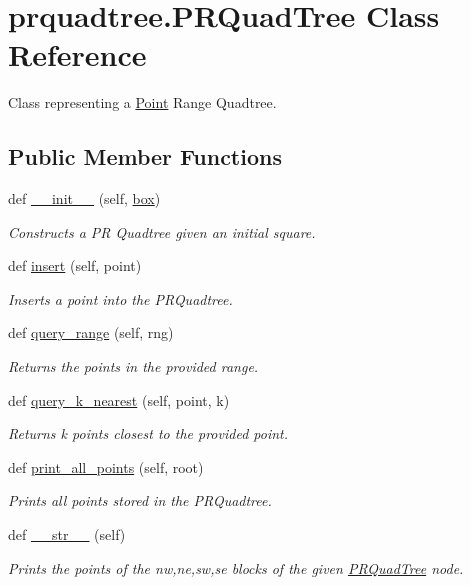 \section{prquadtree.\+P\+R\+Quad\+Tree Class Reference}
\label{classprquadtree_1_1PRQuadTree}


Class representing a \hyperlink{classprquadtree_1_1Point}{Point} Range Quadtree.  


\subsection*{Public Member Functions}
\begin{DoxyCompactItemize}
\item 
def \hyperlink{classprquadtree_1_1PRQuadTree_a56de30271f808d21281b790a19448aab}{\+\_\+\+\_\+init\+\_\+\+\_\+} (self, \hyperlink{classprquadtree_1_1PRQuadTree_a2f1d8e21568aa0467a7dabedb50e3593}{box})
\begin{DoxyCompactList}\small\item\em Constructs a P\+R Quadtree given an initial square. \end{DoxyCompactList}\item 
def \hyperlink{classprquadtree_1_1PRQuadTree_ab9ca8c1d94c56c72f47dabd2f90b7754}{insert} (self, point)
\begin{DoxyCompactList}\small\item\em Inserts a point into the P\+R\+Quadtree. \end{DoxyCompactList}\item 
def \hyperlink{classprquadtree_1_1PRQuadTree_ab145cd20b246f04ddcd53ae9618b5479}{query\+\_\+range} (self, rng)
\begin{DoxyCompactList}\small\item\em Returns the points in the provided range. \end{DoxyCompactList}\item 
def \hyperlink{classprquadtree_1_1PRQuadTree_a578891ac618a6770184fc1c02f426b45}{query\+\_\+k\+\_\+nearest} (self, point, k)
\begin{DoxyCompactList}\small\item\em Returns k points closest to the provided point. \end{DoxyCompactList}\item 
def \hyperlink{classprquadtree_1_1PRQuadTree_a0d43d9d2ebe765b6690067c1d8bc5a8a}{print\+\_\+all\+\_\+points} (self, root)
\begin{DoxyCompactList}\small\item\em Prints all points stored in the P\+R\+Quadtree. \end{DoxyCompactList}\item 
def \hyperlink{classprquadtree_1_1PRQuadTree_a2f9dd431836575327c97cd3fb5426adb}{\+\_\+\+\_\+str\+\_\+\+\_\+} (self)
\begin{DoxyCompactList}\small\item\em Prints the points of the nw,ne,sw,se blocks of the given \hyperlink{classprquadtree_1_1PRQuadTree}{P\+R\+Quad\+Tree} node. \end{DoxyCompactList}\end{DoxyCompactItemize}
